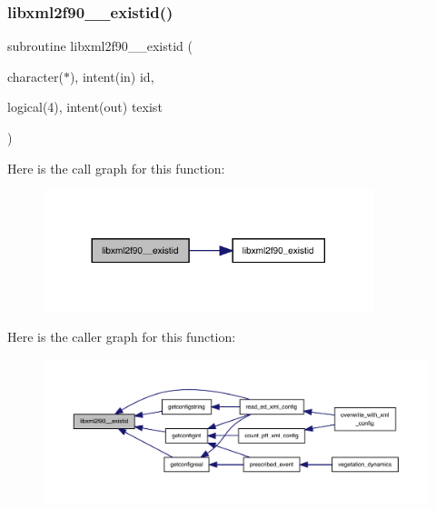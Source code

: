\subsubsection{\texorpdfstring{libxml2f90\+\_\+\+\_\+existid()}{libxml2f90\_\_existid()}}
{\footnotesize\ttfamily subroutine libxml2f90\+\_\+\+\_\+existid (\begin{DoxyParamCaption}\item[{character($\ast$), intent(in)}]{id,  }\item[{logical(4), intent(out)}]{texist }\end{DoxyParamCaption})}

Here is the call graph for this function\+:
\nopagebreak
\begin{figure}[H]
\begin{center}
\leavevmode
\includegraphics[width=272pt]{libxml2f90_8f90__pp_8f90_aa7cbdbfe67d0ec6b1ce87ce016b6cb22_cgraph}
\end{center}
\end{figure}
Here is the caller graph for this function\+:
\nopagebreak
\begin{figure}[H]
\begin{center}
\leavevmode
\includegraphics[width=350pt]{libxml2f90_8f90__pp_8f90_aa7cbdbfe67d0ec6b1ce87ce016b6cb22_icgraph}
\end{center}
\end{figure}
\mbox{\label{libxml2f90_8f90__pp_8f90_a6269f2e5870605109c32aadf4a17808c}} 
